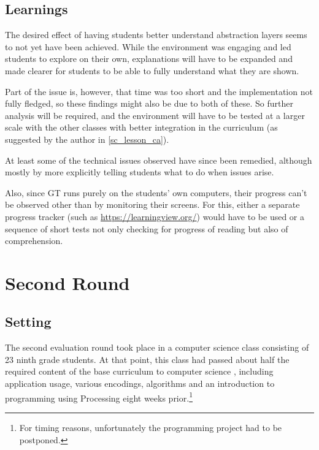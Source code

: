 \subsection{Learnings}

The desired effect of having students better understand abstraction layers seems to not yet have been achieved. While the environment was engaging and led students to explore on their own, explanations will have to be expanded and made clearer for students to be able to fully understand what they are shown.

Part of the issue is, however, that time was too short and the implementation not fully fledged, so these findings might also be due to both of these. So further analysis will be required, and the environment will have to be tested at a larger scale with the other classes with better integration in the curriculum (as suggested by the author in \ref{sc_lesson_ca}).

At least some of the technical issues observed have since been remedied, although mostly by more explicitly telling students what to do when issues arise.

Also, since \ac{GT} runs purely on the students' own computers, their progress can't be observed other than by monitoring their screens. For this, either a separate progress tracker (such as \url{https://learningview.org/}) would have to be used or a sequence of short tests not only checking for progress of reading but also of comprehension.



\section{Second Round} \label{sc_validation_compiler} %

\subsection{Setting}

The second evaluation round took place in a computer science class consisting of 23 ninth grade students. At that point, this class had passed about half the required content of the base curriculum to computer science \cite[p.\,145--146]{Erz16}, including application usage, various encodings, algorithms and an introduction to programming using Processing eight weeks prior.\footnote{For timing reasons, unfortunately the programming project had to be postponed.}

